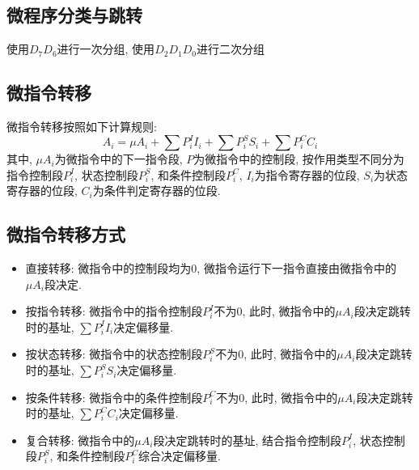 \documentclass[10pt]{book}
\begin{document}
\subsection{微程序分类与跳转}
使用$D_{7}D_{6}$进行一次分组, 使用$D_{2}D_{1}D_{0}$进行二次分组

\subsection{微指令转移}
微指令转移按照如下计算规则:
\begin{equation}
A_{i}=\mu A_{i}+\sum P^{I}_{i}I_{i}+\sum P^{S}_{i}S_{i}+\sum P^{C}_{i}C_{i}
\end{equation}
其中, $\mu A_{i}$为微指令中的下一指令段, $P$为微指令中的控制段, 按作用类型不同分为指令控制段$P^{I}_{i}$, 状态控制段$P^{S}_{i}$, 和条件控制段$P^{C}_{i}$, $I_{i}$为指令寄存器的位段, $S_{i}$为状态寄存器的位段, $C_{i}$为条件判定寄存器的位段.

\subsection{微指令转移方式}
\begin{itemize}
  \item 直接转移: 微指令中的控制段均为0, 微指令运行下一指令直接由微指令中的$\mu A_{i}$段决定.
  \item 按指令转移: 微指令中的指令控制段$P^{I}_{i}$不为0, 此时, 微指令中的$\mu A_{i}$段决定跳转时的基址, $\sum P^{I}_{i}I_{i}$决定偏移量.
  \item 按状态转移: 微指令中的状态控制段$P^{S}_{i}$不为0, 此时, 微指令中的$\mu A_{i}$段决定跳转时的基址, $\sum P^{S}_{i}S_{i}$决定偏移量.
  \item 按条件转移: 微指令中的条件控制段$P^{C}_{i}$不为0, 此时, 微指令中的$\mu A_{i}$段决定跳转时的基址, $\sum P^{C}_{i}C_{i}$决定偏移量.
  \item 复合转移: 微指令中的$\mu A_{i}$段决定跳转时的基址, 结合指令控制段$P^{I}_{i}$, 状态控制段$P^{S}_{i}$, 和条件控制段$P^{C}_{i}$综合决定偏移量.
\end{itemize}
\end{document}
